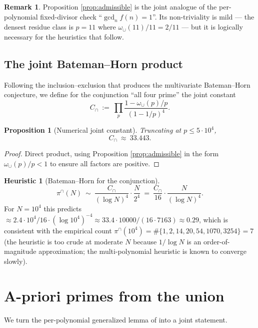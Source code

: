\documentclass[11pt]{article}
\newtheorem{proposition}[theorem]{Proposition}
\theoremstyle{definition}
\newtheorem{remark}[theorem]{Remark}
\newtheorem{heuristic}[theorem]{Heuristic}
\begin{document}
\begin{remark}
Proposition \ref{prop:admissible} is the joint analogue of the per-polynomial fixed-divisor check ``$\gcd_n f(n)=1$''. Its non-triviality is mild --- the densest residue class is $p=11$ where $\omega_\cup(11)/11=2/11$ --- but it is logically necessary for the heuristics that follow.
\end{remark}

\subsection{The joint Bateman--Horn product}

Following the inclusion--exclusion that produces the multivariate Bateman--Horn conjecture, we define for the conjunction ``all four prime'' the joint constant
\[
C_\cap\ :=\ \prod_p \frac{1-\omega_\cup(p)/p}{(1-1/p)^4}.
\]

\begin{proposition}[Numerical joint constant]\label{prop:cjoint}
Truncating at $p\le 5\cdot 10^4$,
\[
C_\cap\ \approx\ 33.443.
\]
\end{proposition}

\begin{proof}
Direct product, using Proposition \ref{prop:admissible} in the form $\omega_\cup(p)/p<1$ to ensure all factors are positive.
\end{proof}

\begin{heuristic}[Bateman--Horn for the conjunction]\label{heur:cap}
\[
\pi^\cap(N)\ \sim\ \frac{C_\cap}{(\log N)^4}\cdot \frac{N}{2^4}\ =\ \frac{C_\cap}{16}\cdot\frac{N}{(\log N)^4}.
\]
For $N=10^4$ this predicts $\approx 2.4\cdot 10^4 / 16\cdot (\log 10^4)^{-4}\approx 33.4\cdot 10000/(16\cdot 7163)\approx 0.29$, which is consistent with the empirical count $\pi^\cap(10^4) = \#\{1,2,14,20,54,1070,3254\}=7$ (the heuristic is too crude at moderate $N$ because $1/\log N$ is an order-of-magnitude approximation; the multi-polynomial heuristic is known to converge slowly).
\end{heuristic}

\section{A-priori primes from the union}\label{sec:apriori}

We turn the per-polynomial generalized lemma of \cite{B8} into a joint statement.
\end{document}
